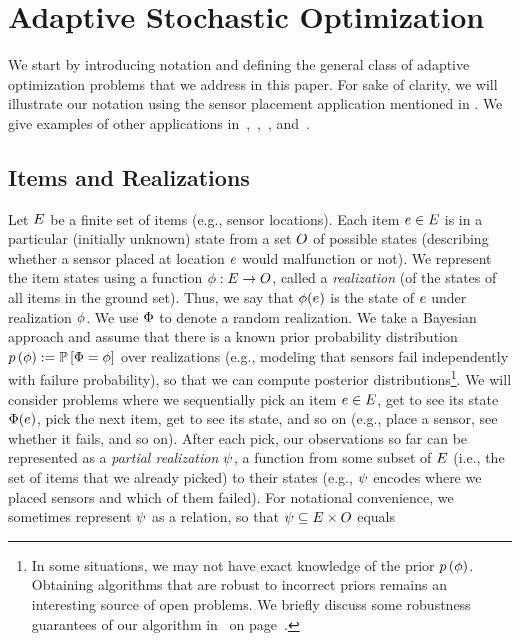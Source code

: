 \section{Adaptive Stochastic Optimization} \label{sec:problem-statment}
We start by introducing notation and defining the general class of adaptive optimization problems that we address in this paper. For sake of clarity, we will illustrate our notation using the sensor placement application mentioned in . We give examples of other applications in~,~,~,
and~. 

\subsection{Items and Realizations} Let $E$ be a finite set
of items (e.g., sensor locations).  Each item $e\in E$ is
in a particular (initially unknown) state from a set $O$ of
possible states 
(describing whether a sensor
placed at location $e$ would malfunction or not). 
We represent the item states using a
function ${\color{black}{\ensuremath{\phi}}}:E\rightarrow O$, called a 
\emph{realization} (of the states of all items in the ground set).
Thus, we say that ${\color{black}{\ensuremath{\phi}}}(e)$ is the state of $e$ under
realization ${\color{black}{\ensuremath{\phi}}}$.
We use ${\color{black}{\ensuremath{\Phi}}}$ to denote a random realization. 
We take a Bayesian approach and assume that there is a known prior
probability distribution ${\color{black}{\ensuremath{p \left( {{\color{black}{\ensuremath{\phi}}}} \right) }}} := \mathbb{P}\left[{\color{black}{\ensuremath{\Phi}}} = {\color{black}{\ensuremath{\phi}}}\right] $ over realizations (e.g., modeling
that sensors fail independently with failure probability), so that 
we can compute posterior distributions\footnote{In some situations, we
may not have exact knowledge of the prior ${\color{black}{\ensuremath{p \left( {{\color{black}{\ensuremath{\phi}}}} \right) }}}$.  Obtaining
algorithms that are robust to incorrect priors remains an interesting
source of open problems.  We briefly discuss some robustness
guarantees of our algorithm in~ on page~\pageref{sec:robustness}.}.
%
We will consider problems where we sequentially pick an item
$e\in E$, get to see its state ${\color{black}{\ensuremath{\Phi}}}(e)$, pick the
next item, get to see its state, and so on (e.g., place a sensor, see whether it fails, and so on).  After each pick, our
observations so far can be represented as a \emph{partial realization}
${\color{black}{\ensuremath{\psi}}}$, a function from some
subset of $E$ (i.e., the set of items that we already picked)
to their states (e.g., ${\color{black}{\ensuremath{\psi}}}$ encodes where we placed sensors and which of them failed).  
For notational convenience, we sometimes represent  ${\color{black}{\ensuremath{\psi}}}$ as a relation, so that ${\color{black}{\ensuremath{\psi}}} \subseteq E \times O$ equals 
